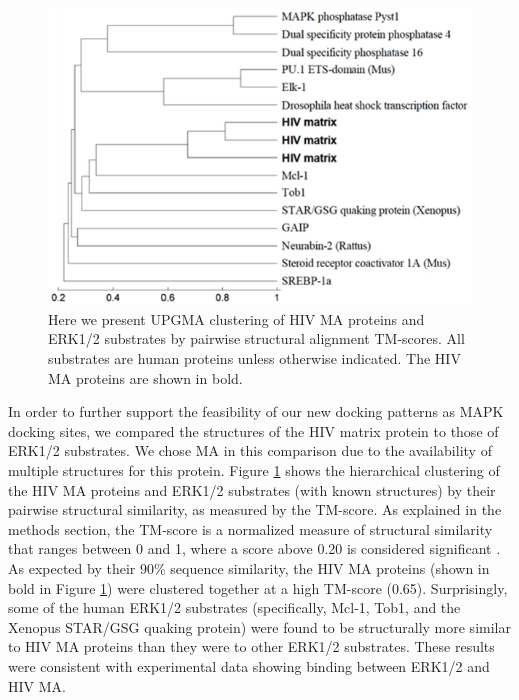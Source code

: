 \begin{figure}
\begin{center}
\includegraphics[scale=0.8]{figs/plos1_4}
\end{center}
\caption[MAPK substrate hierarchy]{\small Here we present UPGMA
  clustering of HIV MA proteins and ERK1/2 substrates by pairwise
  structural alignment TM-scores. All substrates are human proteins
  unless otherwise indicated. The HIV MA proteins are shown in
  bold. \label{fig:plos1:fig4}}
\end{figure}

In order to further support the feasibility of our new docking
patterns as MAPK docking sites, we compared the structures of the HIV
matrix protein to those of ERK1/2 substrates. We chose MA in this
comparison due to the availability of multiple structures for this
protein. Figure \ref{fig:plos1:fig4} shows the hierarchical clustering
of the HIV MA proteins and ERK1/2 substrates (with known structures)
by their pairwise structural similarity, as measured by the
TM-score. As explained in the methods section, the TM-score is a
normalized measure of structural similarity that ranges between 0 and
1, where a score above 0.20 is considered significant
\cite{zhang04}. As expected by their 90\% sequence similarity, the HIV
MA proteins (shown in bold in Figure \ref{fig:plos1:fig4}) were
clustered together at a high TM-score (0.65). Surprisingly, some of
the human ERK1/2 substrates (specifically, Mcl-1, Tob1, and the
Xenopus STAR/GSG quaking protein) were found to be structurally more
similar to HIV MA proteins than they were to other ERK1/2
substrates. These results were consistent with experimental data
showing binding between ERK1/2 and HIV MA.

